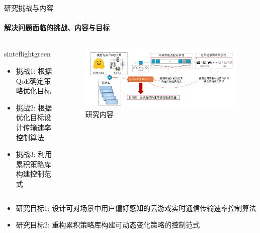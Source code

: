 \documentclass{beamer}
\begin{document}
\begin{frame}[fragile]{研究挑战与内容}
\framesubtitle{解决问题面临的挑战、内容与目标}

    \begin{columns}
        \begin{column}{0.35\textwidth}
            \begin{colorblock}[black]{sinteflightgreen}{}
            \begin{itemize}
                \item 挑战1: 根据QoE确定策略优化目标
                \item 挑战2: 根据优化目标设计传输速率控制算法
                \item 挑战3: 利用累积策略库构建控制范式
                
            \end{itemize}
            \end{colorblock}
            
        \end{column}

        \begin{column}{0.72\textwidth}
            \begin{figure} [ht]
            \centering
            \includegraphics[width=\textwidth]{figures/chap01/final_goal.pdf} 
            \caption{研究内容}
            \label{fig:teaser_system_archi}
            \end{figure} 
        \vspace{-2em}
        
        \end{column}
        
    \end{columns}

    \begin{block}{}
            \begin{itemize}
                \item 研究目标1: 设计可对场景中用户偏好感知的云游戏实时通信传输速率控制算法
                \item 研究目标2: 重构累积策略库构建可动态变化策略的控制范式
            \end{itemize}            
        \end{block}
\end{frame}
\end{document}
